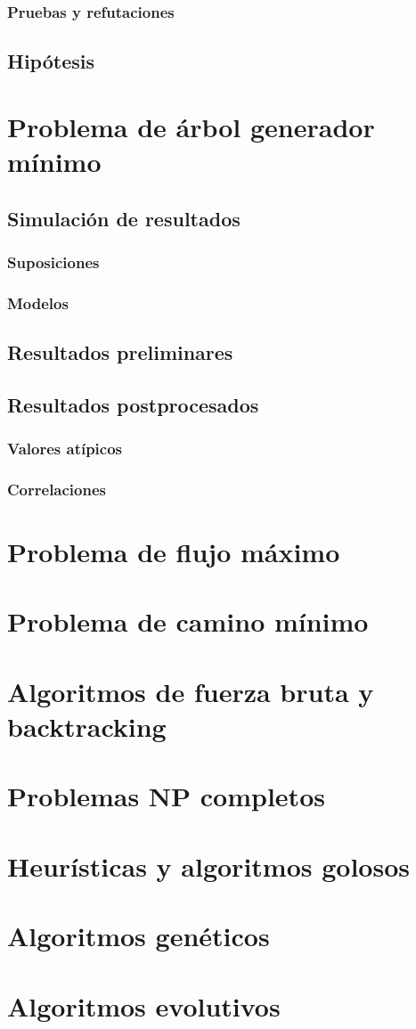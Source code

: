 \documentclass[12pt]{book}
\begin{document}
\subsection{Pruebas y refutaciones}
\section{Hipótesis}
\chapter{Problema de árbol generador mínimo}
\section{Simulación de resultados}
\subsection{Suposiciones}
\subsection{Modelos}
\section{Resultados preliminares}
\section{Resultados postprocesados}
\subsection{Valores atípicos}
\subsection{Correlaciones}
\chapter{Problema de flujo máximo}
\chapter{Problema de camino mínimo}
\chapter{Algoritmos de fuerza bruta y backtracking}
\chapter{Problemas NP completos}
\chapter{Heurísticas y algoritmos golosos}

\chapter{Algoritmos genéticos}
\chapter{Algoritmos evolutivos}
\end{document}
